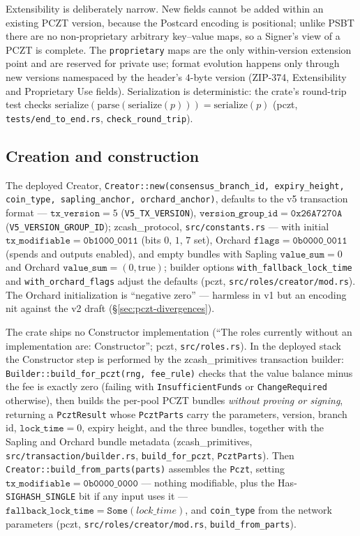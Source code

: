 \documentclass[11pt,a4paper]{article}
\theoremstyle{definition}
\begin{document}
Extensibility is deliberately narrow. New fields cannot be added within
an existing PCZT version, because the Postcard encoding is positional;
unlike PSBT there are no non-proprietary arbitrary key--value maps, so a
Signer's view of a PCZT is complete. The \texttt{proprietary} maps are
the only within-version extension point and are reserved for private use;
format evolution happens only through new versions namespaced by the
header's $4$-byte version (ZIP-374, Extensibility and Proprietary Use
fields). Serialization is deterministic: the crate's round-trip test
checks
$\mathrm{serialize}(\mathrm{parse}(\mathrm{serialize}(p))) =
\mathrm{serialize}(p)$ (\textsf{pczt}, \texttt{tests/end\_to\_end.rs},
\texttt{check\_round\_trip}).

\subsection{Creation and construction}\label{sec:pczt-create}

The deployed Creator,
\texttt{Creator::new(consensus\_branch\_id, expiry\_height, coin\_type,
sapling\_anchor, orchard\_anchor)}, defaults to the v5 transaction format
--- $\texttt{tx\_version} = 5$
(\texttt{V5\_TX\_VERSION}), $\texttt{version\_group\_id} =
\mathtt{0x26A7270A}$ (\texttt{V5\_VERSION\_GROUP\_ID});
\textsf{zcash\_protocol}, \texttt{src/constants.rs} --- with initial
$\texttt{tx\_modifiable} = \mathtt{0b1000\_0011}$ (bits $0$, $1$, $7$
set), Orchard $\texttt{flags} = \mathtt{0b0000\_0011}$ (spends and
outputs enabled), and empty bundles with Sapling
$\texttt{value\_sum} = 0$ and Orchard $\texttt{value\_sum} = (0,
\mathrm{true})$; builder options \texttt{with\_fallback\_lock\_time} and
\texttt{with\_orchard\_flags} adjust the defaults (\textsf{pczt},
\texttt{src/roles/creator/mod.rs}). The Orchard initialization is
``negative zero'' --- harmless in v1 but an encoding nit against the v2
draft (\S\ref{sec:pczt-divergences}).

The crate ships no Constructor implementation (``The roles currently
without an implementation are: Constructor''; \textsf{pczt},
\texttt{src/roles.rs}). In the deployed stack the Constructor step is
performed by the \textsf{zcash\_primitives} transaction builder:
\texttt{Builder::build\_for\_pczt(rng, fee\_rule)} checks that the value
balance minus the fee is exactly zero (failing with
\texttt{InsufficientFunds} or \texttt{ChangeRequired} otherwise), then
builds the per-pool PCZT bundles \emph{without proving or signing},
returning a \texttt{PcztResult} whose \texttt{PcztParts} carry the
parameters, version, branch id, $\texttt{lock\_time} = 0$, expiry height,
and the three bundles, together with the Sapling and Orchard bundle
metadata (\textsf{zcash\_primitives},
\texttt{src/transaction/builder.rs}, \texttt{build\_for\_pczt},
\texttt{PcztParts}). Then \texttt{Creator::build\_from\_parts(parts)}
assembles the \texttt{Pczt}, setting
$\texttt{tx\_modifiable} = \mathtt{0b0000\_0000}$ --- nothing modifiable,
plus the Has-\texttt{SIGHASH\_SINGLE} bit if any input uses it ---
$\texttt{fallback\_lock\_time} = \texttt{Some}(\mathit{lock\_time})$, and
\texttt{coin\_type} from the network parameters (\textsf{pczt},
\texttt{src/roles/creator/mod.rs}, \texttt{build\_from\_parts}).
\end{document}
